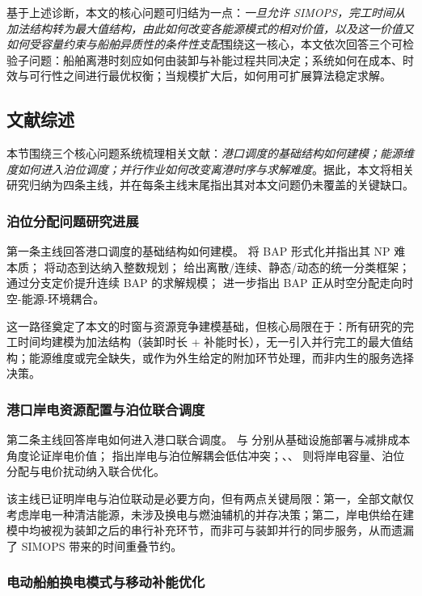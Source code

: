 \documentclass[UTF8, a4paper, 12pt]{ctexart}
\theoremstyle{plain}
\theoremstyle{definition}
\theoremstyle{remark}
\begin{document}
基于上述诊断，本文的核心问题可归结为一点：\emph{一旦允许 SIMOPS，完工时间从加法结构转为最大值结构，由此如何改变各能源模式的相对价值，以及这一价值又如何受容量约束与船舶异质性的条件性支配}围绕这一核心，本文依次回答三个可检验子问题：船舶离港时刻应如何由装卸与补能过程共同决定；系统如何在成本、时效与可行性之间进行最优权衡；当规模扩大后，如何用可扩展算法稳定求解。
\subsection{文献综述}
\label{sec:lit_review}
 
本节围绕三个核心问题系统梳理相关文献：\emph{港口调度的基础结构如何建模；能源维度如何进入泊位调度；并行作业如何改变离港时序与求解难度}。据此，本文将相关研究归纳为四条主线，并在每条主线末尾指出其对本文问题仍未覆盖的关键缺口。
 
\subsubsection{泊位分配问题研究进展}
 
第一条主线回答港口调度的基础结构如何建模。\citet{Lim1998} 将 BAP 形式化并指出其 NP 难本质；\citet{Imai2001} 将动态到达纳入整数规划；\citet{Bierwirth2010} 给出离散/连续、静态/动态的统一分类框架；\citet{Correcher2019} 通过分支定价提升连续 BAP 的求解规模；\citet{Rodrigues2022} 进一步指出 BAP 正从时空分配走向时空-能源-环境耦合。
 
这一路径奠定了本文的时窗与资源竞争建模基础，但核心局限在于：所有研究的完工时间均建模为加法结构（装卸时长 + 补能时长），无一引入并行完工的最大值结构；能源维度或完全缺失，或作为外生给定的附加环节处理，而非内生的服务选择决策。
 
\subsubsection{港口岸电资源配置与泊位联合调度}
 
第二条主线回答岸电如何进入港口联合调度。\citet{Winkel2016} 与 \citet{Zis2014} 分别从基础设施部署与减排成本角度论证岸电价值；\citet{Iris2019} 指出岸电与泊位解耦会低估冲突；\citet{Peng2021}、\citet{Yu2022_SP}、\citet{Zou2024} 则将岸电容量、泊位分配与电价扰动纳入联合优化。
 
该主线已证明岸电与泊位联动是必要方向，但有两点关键局限：第一，全部文献仅考虑岸电一种清洁能源，未涉及换电与燃油辅机的并存决策；第二，岸电供给在建模中均被视为装卸之后的串行补充环节，而非可与装卸并行的同步服务，从而遗漏了 SIMOPS 带来的时间重叠节约。
 
\subsubsection{电动船舶换电模式与移动补能优化}
 
\end{document}
